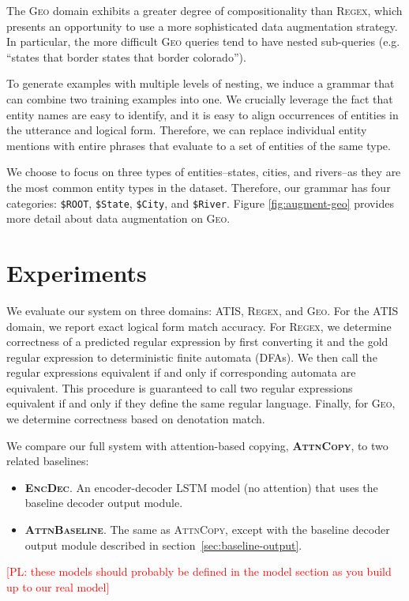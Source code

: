 \documentclass[11pt,letterpaper]{article}
\newcommand{\encdec}{\textsc{EncDec}\xspace}
\newcommand{\attn}{\textsc{AttnBaseline}\xspace}
\newcommand{\attncopy}{\textsc{AttnCopy}\xspace}
\newcommand{\atis}{\textsc{ATIS}\xspace}
\newcommand{\regex}{\textsc{Regex}\xspace}
\newcommand{\geo}{\textsc{Geo}\xspace}
\newcommand\pl[1]{\textcolor{red}{[PL: #1]}}
\begin{document}
The \geo domain exhibits a greater degree of compositionality
than \regex, which presents an opportunity to use a more sophisticated
data augmentation strategy.
In particular, the more difficult \geo queries tend to have
nested sub-queries (e.g. ``states that border states that border colorado'').

To generate examples with multiple levels of nesting,
we induce a grammar that can combine two training examples into one.
We crucially leverage the fact that entity names are
easy to identify, and it is easy to align occurrences of entities
in the utterance and logical form.
Therefore, we can replace individual entity mentions
with entire phrases that evaluate to a set of entities of the same type.

We choose to focus on three types of entities--states, cities, 
and rivers--as they are the most common entity types in the dataset.
Therefore, our grammar has four categories:
\texttt{\$ROOT}, \texttt{\$State}, \texttt{\$City}, and \texttt{\$River}.
Figure \ref{fig:augment-geo}
provides more detail about data augmentation on \geo.

\section{Experiments}
We evaluate our system on three domains: \atis, \regex, and \geo.
For the \atis domain, we report exact logical form match accuracy.
For \regex, we determine correctness of a predicted regular expression
by first converting it and the gold regular expression to
deterministic finite automata (DFAs).  We then call the regular expressions
equivalent if and only if corresponding automata are equivalent.
This procedure is guaranteed to call two regular expressions equivalent
if and only if they define the same regular language.
Finally, for \geo, we determine correctness based on denotation match.

We compare our full system with attention-based copying, \textbf{\attncopy}, 
to two related baselines:
\begin{itemize}
  \item \textbf{\encdec}.  An encoder-decoder LSTM model (no attention)
    that uses the baseline decoder output module.
  \item \textbf{\attn}.  The same as \attncopy, except with the baseline decoder
    output module described in section~\ref{sec:baseline-output}.
\end{itemize}
\pl{these models should probably be defined in the model section as you build up to our
real model}
\end{document}
